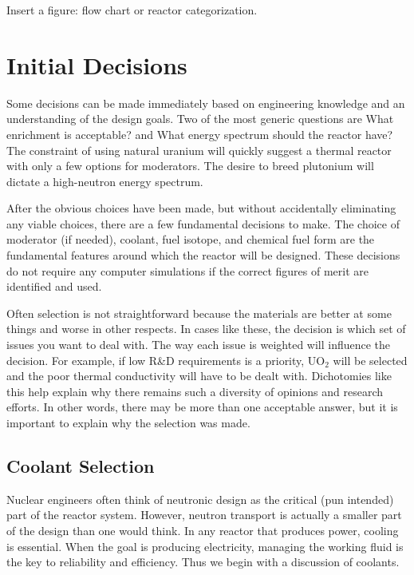 Insert a figure: flow chart or reactor categorization.

\section{Initial Decisions}
Some decisions can be made immediately based on engineering knowledge and an understanding of the design goals. Two of the most generic questions are What enrichment is acceptable? and What energy spectrum should the reactor have? The constraint of using natural uranium will quickly suggest a thermal reactor with only a few options for moderators. The desire to breed plutonium will dictate a high-neutron energy spectrum. 

After the obvious choices have been made, but without accidentally eliminating any viable choices, there are a few fundamental decisions to make. The choice of moderator (if needed), coolant, fuel isotope, and chemical fuel form are the fundamental features around which the reactor will be designed. These decisions do not require any computer simulations if the correct figures of merit are identified and used. 

Often selection is not straightforward because the materials are better at some things and worse in other respects. In cases like these, the decision is which set of issues you want to deal with.
The way each issue is weighted will influence the decision. For example, if low R\&D requirements is a priority, UO$_2$ will be selected and the poor thermal conductivity will have to be dealt with. 
Dichotomies like this help explain why there remains such a diversity of opinions and research efforts.
In other words, there may be more than one acceptable answer, but it is important to explain why the selection was made.


\subsection{Coolant Selection}
Nuclear engineers often think of neutronic design as the critical (pun intended) part of the reactor system. However, neutron transport is actually a smaller part of the design than one would think.
In any reactor that produces power, cooling is essential. When the goal is producing electricity, managing the working fluid is the key to reliability and efficiency. Thus we begin with a discussion of coolants.

